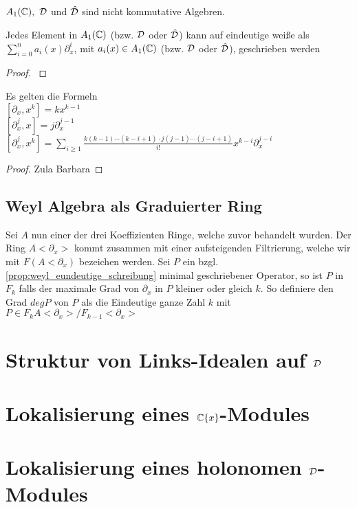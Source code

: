 \begin{rem}
  $A_1({\mathbb C}),~{\mathcal{D}}$ und $\hat{{\mathcal{D}}}$ sind nicht kommutative Algebren.
\end{rem}

\begin{prop} \label{prop:weyl_eundeutige_schreibung}
  Jedes Element in $A_1({\mathbb C})$ (bzw. ${\mathcal{D}}$ oder $\hat{{\mathcal{D}}}$) kann auf eindeutige
  weiße als $\sum_{i=0}^na_i(x)\partial_x^i$, mit $a_i(x)\in A_1({\mathbb C})$ (bzw.
  ${\mathcal{D}}$ oder $\hat{{\mathcal{D}}}$), geschrieben werden
\end{prop}
\begin{proof}
  \cite[Proposition 1.2.3]{sabbah_cimpa90}
  \begin{comment}
    ein teil des Beweises ist "left as an exersice"
  \end{comment}
\end{proof}

\begin{lem}
  Es gelten die Formeln\\
  $ [\partial_x,x^k] = kx^{k-1} $\\
  $ [\partial_x^j,x] = j\partial_x^{j-1} $\\
  $ [\partial_x^j,x^k] = \sum_{i\geq1}\frac{k(k-1)\cdots(k-i+1)
    \cdot j(j-1)\cdots(j-i+1)}{i!}x^{k-i}\partial_x^{j-i} $
\end{lem}
\begin{proof}
  Zula Barbara
\end{proof}

\subsection{Weyl Algebra als Graduierter Ring}
Sei $A$ nun einer der drei Koeffizienten Ringe, welche zuvor behandelt wurden.
Der Ring $A<\partial_x>$ kommt zusammen mit einer aufsteigenden Filtrierung,
welche wir mit $F(A<\partial_x)$ bezeichen werden.
Sei $P$ ein bzgl. \ref{prop:weyl_eundeutige_schreibung} minimal geschriebener
Operator, so ist $P$ in $F_k$ falls der maximale Grad von $\partial_x$ in $P$
kleiner oder gleich $k$. So definiere den Grad $deg P$ von $P$ als die 
Eindeutige ganze Zahl $k$ mit $P\in F_kA<\partial_x>\slash F_{k-1}<\partial_x>$
\begin{comment}
  Unabhängigkeit von Schreibung wird in Sabbah Script behauptet
\end{comment}

\section{Struktur von Links-Idealen auf ${\mathcal{D}}$}

\section{Lokalisierung eines ${\mathbb C}\{x\}$-Modules} %

\section{Lokalisierung eines holonomen ${\mathcal{D}}$-Modules}

